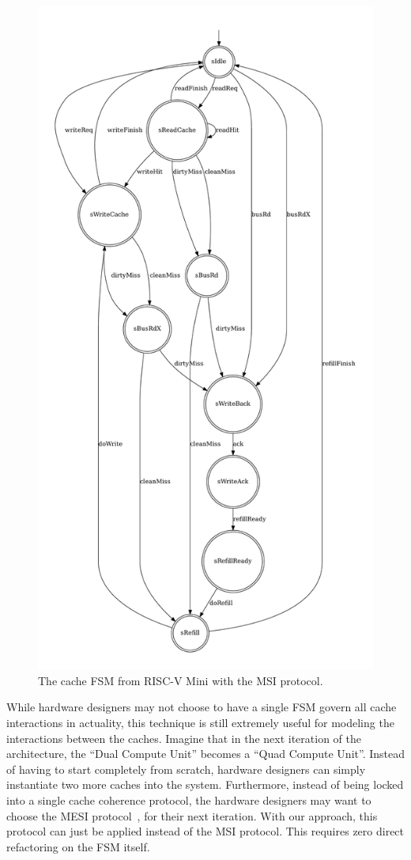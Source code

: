 \documentclass[sigplan,anonymous,review]{acmart}
\begin{document}
\begin{figure}
    \centering
    \includegraphics[width=0.7\linewidth]{figures/cacheFSM2.pdf}
    \caption{The cache FSM from RISC-V Mini with the MSI protocol.}
    \label{fig:cacheAfter}
\end{figure}

While hardware designers may not choose to have a single FSM govern all cache interactions in actuality, this technique is still extremely useful for modeling the interactions between the caches. Imagine that in the next iteration of the architecture, the ``Dual Compute Unit'' becomes a ``Quad Compute Unit''. Instead of having to start completely from scratch, hardware designers can simply instantiate two more caches into the system. Furthermore, instead of being locked into a single cache coherence protocol, the hardware designers may want to choose the MESI protocol~\cite{}, for their next iteration. With our approach, this protocol can just be applied instead of the MSI protocol. This requires zero direct refactoring on the FSM itself.
\end{document}
